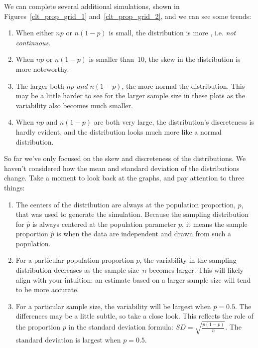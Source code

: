 \D{\newpage}

We can complete several additional simulations,
shown in
Figures~\ref{clt_prop_grid_1}
and~\ref{clt_prop_grid_2},
and we can see some trends:
\begin{enumerate}
\item When either $np$ or $n(1 - p)$ is small, the
    distribution is more ,
    i.e. \emph{not continuous}.
\item When $np$ or $n(1-p)$ is smaller than~10,
    the skew in the distribution is more noteworthy.
\item The larger both $np$ \emph{and} $n(1 - p)$,
    the more normal the distribution.
    This may be a little harder to see for the larger
    sample size in these plots as the variability
    also becomes much smaller.
\item When $np$ and $n(1 - p)$ are both very large,
    the distribution's discreteness is hardly evident,
    and the distribution looks much more
    like a normal distribution.
\end{enumerate}


\noindent So far we've only focused on the skew and discreteness
of the distributions.
We haven't considered how the mean and standard deviation
of the distributions change.
Take a moment to look back at the graphs,
and pay attention to three things:
\begin{enumerate}
\item The centers of the distribution are always at
    the population proportion, $p$, that was used to
    generate the simulation. Because the sampling
    distribution for $\hat{p}$ is always centered at
    the population parameter $p$, it means the sample
    proportion $\hat{p}$ is  when
    the data are independent and drawn from such
    a population.
\item For a particular population proportion $p$,
    the variability in the sampling distribution
    decreases as the sample size~$n$ becomes larger.
    This will likely align with your intuition:
    an estimate based on a larger sample size will
    tend to be more accurate.
\item For a particular sample size, the variability
    will be largest when $p = 0.5$. The differences
    may be a little subtle, so take a close look.
    This reflects the role of the proportion
    $p$ in the standard deviation formula:
    $SD = \sqrt{\frac{p (1 - p)}{n}}$.
    The standard deviation is largest when $p = 0.5$.
\end{enumerate}

